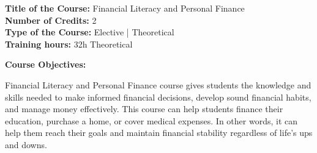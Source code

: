 \documentclass[12pt,a4paper]{article}
\begin{document}
\newpage
\textbf{Title of the Course:} Financial Literacy and Personal Finance\\
\textbf{Number of Credits:} 2\\
\textbf{Type of the Course:} Elective | Theoretical\\
\textbf{Training hours:} 32h Theoretical\par\vspace{4pt}
\textbf{Course Objectives:}\par\vspace{2pt}
Financial Literacy and Personal Finance course gives students the knowledge and skills needed to
make informed financial decisions, develop sound financial habits, and manage money effectively.
This course can help students finance their education, purchase a home, or cover medical expenses.
In other words, it can help them reach their goals and maintain financial stability regardless of
life’s ups and downs.\par\vspace{4pt}
\end{document}
